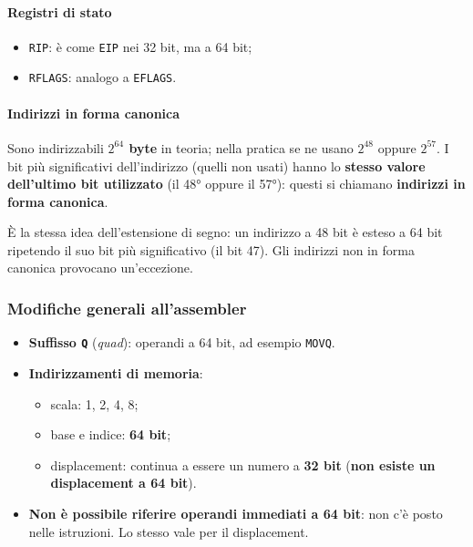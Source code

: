 \documentclass[11pt,a4paper]{article}
\begin{document}
\paragraph*{Registri di stato}

\begin{itemize}[leftmargin=*]
  \item \texttt{RIP}: è come \texttt{EIP} nei 32 bit, ma a 64 bit;
  \item \texttt{RFLAGS}: analogo a \texttt{EFLAGS}.
\end{itemize}

\paragraph*{Indirizzi in forma canonica}

Sono indirizzabili \textbf{$2^{64}$ byte} in teoria; nella pratica se ne usano $2^{48}$ oppure $2^{57}$. I bit più significativi dell'indirizzo (quelli non usati) hanno lo \textbf{stesso valore dell'ultimo bit utilizzato} (il 48° oppure il 57°): questi si chiamano \textbf{indirizzi in forma canonica}.

\begin{integrazione}
È la stessa idea dell'estensione di segno: un indirizzo a 48 bit è esteso a 64 bit ripetendo il suo bit più significativo (il bit 47). Gli indirizzi non in forma canonica provocano un'eccezione.
\end{integrazione}

\subsubsection*{Modifiche generali all'assembler}

\begin{itemize}[leftmargin=*]
  \item \textbf{Suffisso \texttt{Q}} (\emph{quad}): operandi a 64 bit, ad esempio \texttt{MOVQ}.
  \item \textbf{Indirizzamenti di memoria}:
  \begin{itemize}
    \item scala: 1, 2, 4, 8;
    \item base e indice: \textbf{64 bit};
    \item displacement: continua a essere un numero a \textbf{32 bit} (\textbf{non esiste un displacement a 64 bit}).
  \end{itemize}
  \item \textbf{Non è possibile riferire operandi immediati a 64 bit}: non c'è posto nelle istruzioni. Lo stesso vale per il displacement.
\end{itemize}
\end{document}
